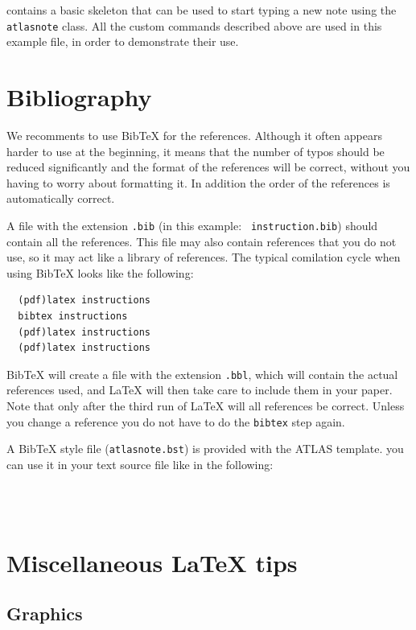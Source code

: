 \documentclass[11pt,a4paper]{atlasnote}
\newcommand{\BibTeX}{{\sc Bib\TeX}}
\begin{document}
 contains a basic skeleton that can be
used to start typing a new note using the {\tt atlasnote} class. All
the custom commands described above are used in this example file, in
order to demonstrate their use.

\section{Bibliography}
\label{app:References}

We recomments to use \BibTeX{} for the references. Although it often
appears harder to use at the beginning, it means that the number of
typos should be reduced significantly and the format of the references
will be correct, without you having to worry about formatting it. In
addition the order of the references is automatically correct.

A file with the extension {\tt .bib} (in this example: {\tt
instruction.bib}) should contain all the references. This file may
also contain references that you do not use, so it may act like a
library of references. The typical comilation cycle when using
\BibTeX{} looks like the following:
%
\begin{verbatim}
  (pdf)latex instructions
  bibtex instructions
  (pdf)latex instructions
  (pdf)latex instructions
\end{verbatim}
%
\BibTeX{} will create a file with the extension {\tt .bbl}, which will
contain the actual references used, and \LaTeX{} will then take care
to include them in your paper. Note that only after the third run of
\LaTeX{} will all references be correct. Unless you change a reference
you do not have to do the {\tt bibtex} step again.

A \BibTeX{} style file ({\tt atlasnote.bst}) is provided with the
ATLAS template. you can use it in your text source file like in the
following:
%
\begin{verbatim}
  
  
\end{verbatim}
%


\section{Miscellaneous \LaTeX{} tips}
\label{app:LatexTips}

\subsection{Graphics}
\end{document}
